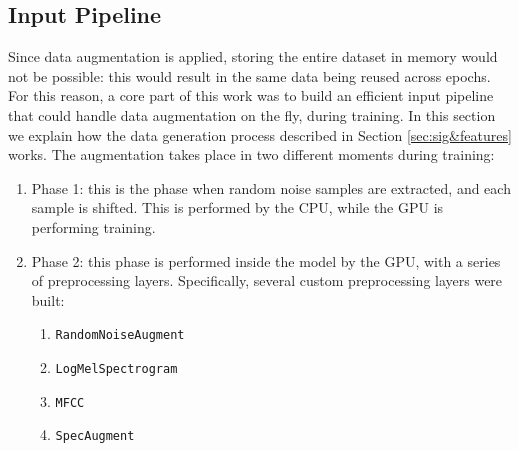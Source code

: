 \subsection{Input Pipeline}
\label{sec:processing_architecture}
Since data augmentation is applied, storing the entire dataset in memory would not be possible: this would result in the same data being reused across epochs. For this reason, a core part of this work was to build an efficient input pipeline that could handle data augmentation on the fly, during training. In this section we explain how the data generation process described in Section \ref{sec:sig&features} works. The augmentation takes place in two different moments during training: 
\begin{enumerate}
	\item Phase 1: this is the phase when random noise samples are extracted, and each sample is shifted. This is performed by the CPU, while the GPU is performing training. 
	\item Phase 2: this phase is performed inside the model by the GPU, with a series of preprocessing layers. Specifically, several custom preprocessing layers were built:
	\begin{enumerate}
		\item \verb|RandomNoiseAugment|
		\item \verb|LogMelSpectrogram|
		\item \verb|MFCC|
		\item \verb|SpecAugment|
	\end{enumerate}
\end{enumerate}

